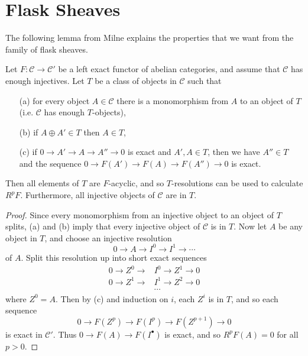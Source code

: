 \section{Flask Sheaves}

The following lemma from Milne \cite{milne} explains the properties that we want from the family of flask sheaves.

\begin{lem}\label{acyclic} Let $F:\mathcal{C}\rightarrow \mathcal{C}'$ be a left exact functor of abelian categories, and assume that $\mathcal{C}$ has enough injectives. Let $T$ be a class of objects in $\mathcal{C}$ such that
\begin{itemize}
\item[{\rm (a)}] for every object $A\in \mathcal{C}$ there is a monomorphism from $A$ to an object of $T$ (i.e. $\mathcal{C}$ has enough $T$-objects),

\item[{\rm (b)}] if $A\oplus A' \in T$ then $A \in T$,

\item[{\rm (c)}] if $0 \rightarrow A' \rightarrow A \rightarrow A'' \rightarrow 0$ is exact and $A', A \in T$, then  we have $A'' \in T$ and the sequence $0 \rightarrow F(A') \rightarrow F(A) \rightarrow F(A'') \rightarrow 0$ is exact.
\end{itemize}
Then all elements of $T$ are $F$-acyclic, and so $T$-resolutions can be used to calculate $R^pF$. Furthermore, all injective objects of $\mathcal{C}$ are in $T$.
\end{lem}
\begin{proof} Since every monomorphism from an injective object to an object of $T$ splits, (a) and (b) imply that every injective object of $\mathcal{C}$ is in $T$. Now let $A$ be any object in $T$, and choose an injective resolution
\[
0 \rightarrow A \rightarrow I^0 \rightarrow I^1 \rightarrow \cdots
\]
of $A$. Split this resolution up into short exact sequences
\begin{align*}
0 \rightarrow Z^0 \rightarrow &I^0 \rightarrow Z^1 \rightarrow 0\\
0 \rightarrow Z^1 \rightarrow &I^1 \rightarrow Z^2 \rightarrow 0\\
&\cdots
\end{align*}
where $Z^0 = A$. Then by (c) and induction on $i$, each $Z^i$ is in $T$, and so each sequence
\[
0 \rightarrow F(Z^p) \rightarrow F(I^p) \rightarrow F(Z^{p+1}) \rightarrow 0
\]
is exact in $\mathcal{C'}$. Thus $0 \rightarrow F(A) \rightarrow F(I^\bullet)$ is exact, and so $R^pF(A) = 0$ for all $p > 0$.
\end{proof}

